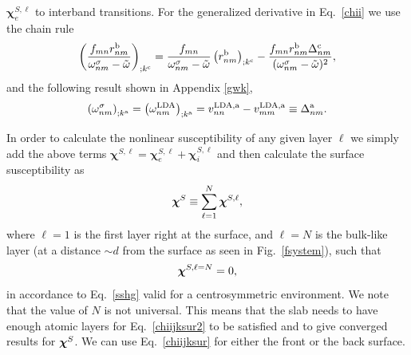 \documentclass[floatfix,prb,aps,superscriptaddress,11pt,preprint,letterpaper]{revtex4}
\begin{document}
$\boldsymbol{\chi}^{S,\ell}_e$
to interband transitions.
For the generalized derivative in Eq.~\eqref{chii} we use the chain rule 
\begin{equation}\label{gene2}
\left(\frac{f_{mn}r_{nm}^{\mathrm{b}}}{\omega^\sigma_{nm}-\tilde\omega}\right)_{;k^{\mathrm{c}}}=
\frac{f_{mn}}{\omega^\sigma_{nm}-\tilde\omega}\left(r_{nm}^{\mathrm{b}}\right)_{;k^{\mathrm{c}}}
-\frac{f_{mn}r_{nm}^{\mathrm{b}}\Delta_{nm}^{\mathrm{c}}}{(\omega^\sigma_{nm}-\tilde\omega)^2}
,
\end{equation}
and the following result
shown in Appendix \ref{gwk},
\begin{align}\label{eli.13}
\left(\omega^\sigma_{nm}\right)_{;k^{\mathrm{a}}}
=
\left(\omega^{\mathrm{LDA}}_{nm}\right)_{;k^{\mathrm{a}}}
= 
v_{nn}^{\mathrm{LDA},\mathrm{a}}-v_{mm}^{\mathrm{LDA},\mathrm{a}}\equiv\Delta_{nm}^{\mathrm{a}}
.
\end{align} 

In order to calculate the nonlinear susceptibility of any given layer 
$\ell$ we simply add the above terms $\boldsymbol{\chi}^{S,\ell}=
\boldsymbol{\chi}_e^{S,\ell}+\boldsymbol{\chi}_i^{S,\ell}$ and 
then calculate the surface susceptibility as 
\begin{equation}\label{chiijksur}
\boldsymbol{\chi}^S\equiv \sum_{\ell=1}^{N}\boldsymbol{\chi}^{S,\ell},
\end{equation} 
where $\ell=1$ is the first layer right at the surface, 
and $\ell=N$ is the bulk-like layer (at a distance $\sim d$ from the
surface  as seen in
Fig.~\ref{fsystem}), such that 
\begin{equation}\label{chiijksur2}
\boldsymbol{\chi}^{S,\ell=N}=0,
\end{equation}
in accordance to Eq.~\eqref{sshg} valid for a centrosymmetric environment. 
We note that the value of
$N$ is not universal.
This means that the slab needs to have enough atomic layers for 
Eq.~\eqref{chiijksur2} 
to be satisfied and to give converged results for $\boldsymbol{\chi}^S$. 
We can use Eq.~\eqref{chiijksur} for
either the front or the back surface.
\end{document}
